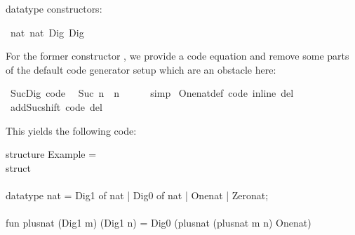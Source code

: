 \begin{isabellebody}
\begin{isamarkuptext}
  datatype constructors:%
\end{isamarkuptext}%
\isamarkuptrue%
%
\isadelimquote
%
\endisadelimquote
%
\isatagquote
{}\isamarkupfalse%
\ {\isachardoublequoteopen}{}{\isasymColon}nat{\isachardoublequoteclose}\ {\isachardoublequoteopen}{}{\isasymColon}nat{\isachardoublequoteclose}\ Dig{}\ Dig{}%
\endisatagquote
{\isafoldquote}%
%
\isadelimquote
%
\endisadelimquote
%
\begin{isamarkuptext}%
\noindent For the former constructor , we provide a code
  equation and remove some parts of the default code generator setup
  which are an obstacle here:%
\end{isamarkuptext}%
\isamarkuptrue%
%
\isadelimquote
%
\endisadelimquote
%
\isatagquote
{}\isamarkupfalse%
\ Suc{\isacharunderscore}Dig\ {\isacharbrackleft}code{\isacharbrackright}{\isacharcolon}\isanewline
\ \ {\isachardoublequoteopen}Suc\ n\ {\isacharequal}\ n\ {\isacharplus}\ {}{\isachardoublequoteclose}\isanewline
\ \ \isamarkupfalse%
\ simp\isanewline
\isanewline
{}\isamarkupfalse%
\ One{\isacharunderscore}nat{\isacharunderscore}def\ {\isacharbrackleft}code\ inline\ del{\isacharbrackright}\isanewline
{}\isamarkupfalse%
\ add{\isacharunderscore}Suc{\isacharunderscore}shift\ {\isacharbrackleft}code\ del{\isacharbrackright}%
\endisatagquote
{\isafoldquote}%
%
\isadelimquote
%
\endisadelimquote
%
\begin{isamarkuptext}%
\noindent This yields the following code:%
\end{isamarkuptext}%
\isamarkuptrue%
%
\isadelimquote
%
\endisadelimquote
%
\isatagquote
%
\begin{isamarkuptext}%
\isaverbatim%
\noindent%
\hspace*{0pt}structure Example = \\
\hspace*{0pt}struct\\
\hspace*{0pt}\\
\hspace*{0pt}datatype nat = Dig1 of nat | Dig0 of nat | One{}nat | Zero{}nat;\\
\hspace*{0pt}\\
\hspace*{0pt}fun plus{}nat (Dig1 m) (Dig1 n) = Dig0 (plus{}nat (plus{}nat m n) One{}nat)\\

\end{isamarkuptext}
\end{isabellebody}
